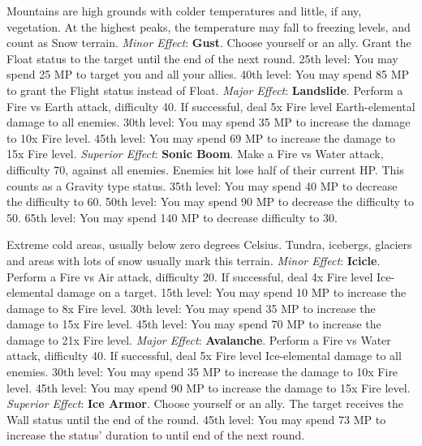 \begin{multicols}{2}
    \ferrum

    Mountains are high grounds with colder temperatures and little, if any, vegetation. At the highest peaks, the temperature may fall to freezing levels, and count as Snow terrain.
	\textit{Minor Effect}: \textbf{Gust}. Choose yourself or an ally. Grant the Float status to the target until the end of the next round. 25th level: You may spend 25 MP to target you and all your allies. 40th level: You may spend 85 MP to grant the Flight status instead of Float.
	\textit{Major Effect}: \textbf{Landslide}. Perform a Fire vs Earth attack, difficulty 40. If successful, deal 5x Fire level Earth-elemental damage to all enemies. 30th level: You may spend 35 MP to increase the damage to 10x Fire level. 45th level: You may spend 69 MP to increase the damage to 15x Fire level.
	\textit{Superior Effect}: \textbf{Sonic Boom}. Make a Fire vs Water attack, difficulty 70, against all enemies. Enemies hit lose half of their current HP. This counts as a Gravity type status. 35th level: You may spend 40 MP to decrease the difficulty to 60. 50th level: You may spend 90 MP to decrease the difficulty to 50. 65th level: You may spend 140 MP to decrease difficulty to 30.

    \ferrum

	Extreme cold areas, usually below zero degrees Celsius. Tundra, icebergs, glaciers and areas with lots of snow usually mark this terrain.
	\textit{Minor Effect}: \textbf{Icicle}. Perform a Fire vs Air attack, difficulty 20. If successful, deal 4x Fire level Ice-elemental damage on a target. 15th level: You may spend 10 MP to increase the damage to 8x Fire level. 30th level: You may spend 35 MP to increase the damage to 15x Fire level. 45th level: You may spend 70 MP to increase the damage to 21x Fire level.
	\textit{Major Effect}: \textbf{Avalanche}. Perform a Fire vs Water attack, difficulty 40. If successful, deal 5x Fire level Ice-elemental damage to all enemies. 30th level: You may spend 35 MP to increase the damage to 10x Fire level. 45th level: You may spend 90 MP to increase the damage to 15x Fire level.
	\textit{Superior Effect}: \textbf{Ice Armor}. Choose yourself or an ally. The target receives the Wall status until the end of the round. 45th level: You may spend 73 MP to increase the status’ duration to until end of the next round.

    \ferrum


\end{multicols}
